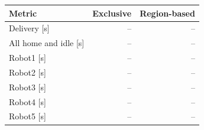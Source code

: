 \begin{tabular}{@{}lrr@{}}
\toprule
Metric & Exclusive & Region-based \\
\midrule
Delivery [s] & -- & -- \\
All home and idle [s] & -- & -- \\
Robot1 [s] & -- & -- \\
Robot2 [s] & -- & -- \\
Robot3 [s] & -- & -- \\
Robot4 [s] & -- & -- \\
Robot5 [s] & -- & -- \\
\bottomrule
\end{tabular}
